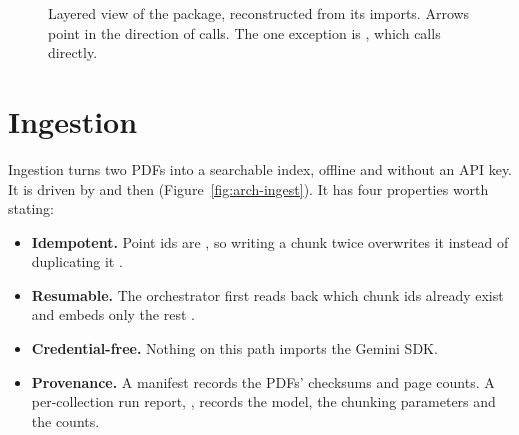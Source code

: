 \begin{figure}[htbp]
{}
\caption{Layered view of the package, reconstructed from its imports. Arrows point in the direction of calls. The one exception is , which calls  directly.}
\label{fig:layers}
\end{figure}

\section{Ingestion}
\label{sec:arch-ingest}

Ingestion turns two PDFs into a searchable index, offline and without an API key. It is driven by  and then  (Figure~\ref{fig:arch-ingest}). It has four properties worth stating:
\begin{itemize}
  \item \textbf{Idempotent.} Point ids are , so writing a chunk twice overwrites it instead of duplicating it .
  \item \textbf{Resumable.} The orchestrator first reads back which chunk ids already exist and embeds only the rest .
  \item \textbf{Credential-free.} Nothing on this path imports the Gemini SDK.
  \item \textbf{Provenance.} A manifest records the PDFs' checksums and page counts. A per-collection run report, , records the model, the chunking parameters and the counts.
\end{itemize}

